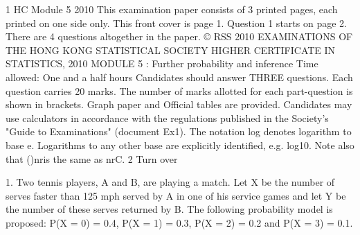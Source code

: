 1 HC Module 5 2010
This examination paper consists of 3 printed pages, each printed on one side only.
This front cover is page 1.
Question 1 starts on page 2.
There are 4 questions altogether in the paper.
© RSS 2010
EXAMINATIONS OF THE HONG KONG STATISTICAL SOCIETY HIGHER CERTIFICATE IN STATISTICS, 2010 MODULE 5 : Further probability and inference Time allowed: One and a half hours Candidates should answer THREE questions. Each question carries 20 marks. The number of marks allotted for each part-question is shown in brackets. Graph paper and Official tables are provided. Candidates may use calculators in accordance with the regulations published in the Society's "Guide to Examinations" (document Ex1). The notation log denotes logarithm to base e. Logarithms to any other base are explicitly identified, e.g. log10. Note also that ()nris the same as nrC.
2
Turn over

1. Two tennis players, A and B, are playing a match. Let X be the number of serves faster than 125 mph served by A in one of his
service games and let Y be the number of these serves returned by B. 
The following probability model is proposed: P(X = 0) = 0.4, P(X = 1) = 0.3, P(X = 2) = 0.2 and P(X = 3) = 0.1. 


